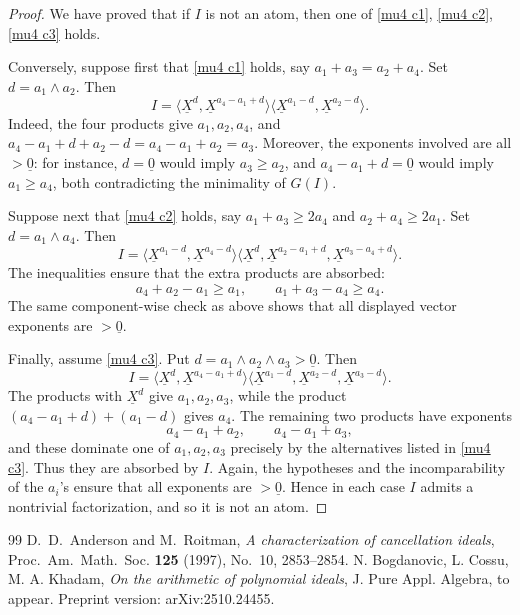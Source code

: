 \documentclass[10pt,a4paper]{amsart}
\begin{document}
\begin{proof}
We have proved that if $I$ is not an atom, then one of \ref{mu4 c1}, \ref{mu4 c2}, \ref{mu4 c3} holds.

Conversely, suppose first that \ref{mu4 c1} holds, say $a_1+a_3=a_2+a_4.$ Set $d=a_1\wedge a_2$. Then
\[
I=
\langle \underline X^d, \underline X^{a_4-a_1+d}\rangle
\langle \underline X^{a_1-d},\underline X^{a_2-d}\rangle .
\]
Indeed, the four products give $a_1,a_2,a_4$, and $a_4-a_1+d+a_2-d=a_4-a_1+a_2=a_3.$ Moreover, the exponents involved are all $>\underline 0$: for instance, $d=\underline 0$ would imply $a_3\ge a_2$, and $a_4-a_1+d=\underline 0$ would imply $a_1\ge a_4$, both contradicting the minimality of $G(I)$.

Suppose next that \ref{mu4 c2} holds, say $a_1+a_3\ge 2a_4$ and $a_2+a_4\ge 2a_1.$ Set $d=a_1\wedge a_4$. Then
\[
I=
\langle \underline X^{a_1-d},\underline X^{a_4-d}\rangle
\langle \underline X^d,\underline X^{a_2-a_1+d},\underline X^{a_3-a_4+d}\rangle .
\]
The inequalities ensure that the extra products are absorbed:
\[
a_4+a_2-a_1\ge a_1,\qquad a_1+a_3-a_4\ge a_4.
\]
The same component-wise check as above shows that all displayed vector exponents are $>\underline 0$.

Finally, assume \ref{mu4 c3}. Put $d=a_1\wedge a_2\wedge a_3>\underline 0.$ Then
\[
I=
\langle \underline X^d,\underline X^{a_4-a_1+d}\rangle
\langle \underline X^{a_1-d},\underline X^{a_2-d},\underline X^{a_3-d}\rangle .
\]
The products with $\underline X^d$ give $a_1,a_2,a_3$, while the product $(a_4-a_1+d)+(a_1-d)$ gives $a_4$. The remaining two products have exponents
\[
a_4-a_1+a_2,\qquad a_4-a_1+a_3,
\]
and these dominate one of $a_1,a_2,a_3$ precisely by the alternatives listed in \ref{mu4 c3}. Thus they are absorbed by $I$. Again, the hypotheses and the incomparability of the $a_i$'s ensure that all exponents are $>\underline 0$. Hence in each case $I$ admits a nontrivial factorization, and so it is not an atom.
\end{proof}

\begin{thebibliography}{99}
 D.~D.~Anderson and M.~Roitman, \emph{A characterization of cancellation ideals}, Proc.~Am.~Math.~Soc. \textbf{125} (1997), No.~10, 2853--2854. %
 N. Bogdanovic, L. Cossu, M. A. Khadam, \emph{On the arithmetic of polynomial ideals}, J. Pure Appl. Algebra, to appear. Preprint version: arXiv:2510.24455. %
\end{thebibliography}
\end{document}
